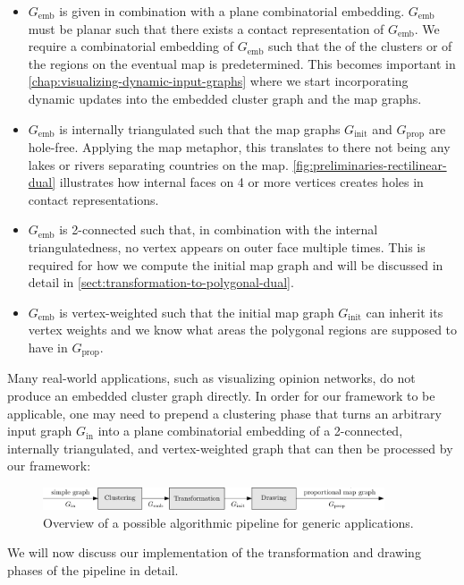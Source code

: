 \begin{itemize}
	\item $G_\text{emb}$ is given in combination with a plane combinatorial embedding. $G_\text{emb}$ must be planar such that there exists a contact representation of $G_\text{emb}$. We require a combinatorial embedding of $G_\text{emb}$ such that the  of the clusters or of the regions on the eventual map is predetermined. This becomes important in \cref{chap:visualizing-dynamic-input-graphs} where we start incorporating dynamic updates into the embedded cluster graph and the map graphs.
	\item $G_\text{emb}$ is internally triangulated such that the map graphs $G_\text{init}$ and $G_\text{prop}$ are hole-free. Applying the map metaphor, this translates to there not being any lakes or rivers separating countries on the map. \cref{fig:preliminaries-rectilinear-dual} illustrates how internal faces on 4 or more vertices creates holes in contact representations.
	\item $G_\text{emb}$ is 2-connected such that, in combination with the internal triangulatedness, no vertex appears on outer face multiple times. This is required for how we compute the initial map graph and will be discussed in detail in \cref{sect:transformation-to-polygonal-dual}.
	\item $G_\text{emb}$ is vertex-weighted such that the initial map graph $G_\text{init}$ can inherit its vertex weights and we know what areas the polygonal regions are supposed to have in $G_\text{prop}$.
\end{itemize}

Many real-world applications, such as visualizing opinion networks, do not produce an embedded cluster graph directly. In order for our framework to be applicable, one may need to prepend a clustering phase that turns an arbitrary input graph $G_\text{in}$ into a plane combinatorial embedding of a 2-connected, internally triangulated, and vertex-weighted graph that can then be processed by our framework:
%
\begin{figure}[H]
	\centering\includegraphics[width=0.9\textwidth]{Resources/Pipeline-Application-Static.pdf}
	\caption{Overview of a possible algorithmic pipeline for generic applications.}
	\label{fig:static-pipeline-application}
\end{figure}

We will now discuss our implementation of the transformation and drawing phases of the pipeline in detail.

\clearpage


\clearpage

